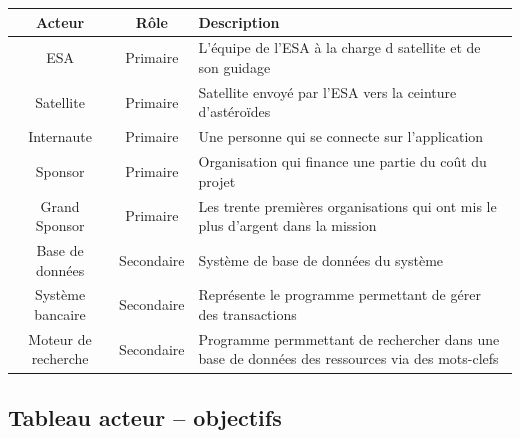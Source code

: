 \documentclass[11pt,a4paper]{article}
\begin{document}
\begin{tabularx}{\linewidth}{|c|c|X|}
    \hline
    \textbf{Acteur} & \textbf{R\^ole} & \textbf{Description} \\
    \hline
    
    ESA & Primaire & L'\'equipe de l'ESA à la charge d
    satellite et de son guidage \\
    
    \hline
    
    Satellite & Primaire & Satellite envoy\'e par l'ESA
    vers la ceinture d'ast\'ero\"ides \\
    
    \hline
    
    Internaute & Primaire & Une personne qui se connecte sur
    l'application \\
    
    \hline
    
    Sponsor & Primaire & Organisation qui finance une
    partie du co\^ut du projet \\
    
    \hline
    
    Grand Sponsor & Primaire & Les trente premières 
    organisations qui ont mis le plus d'argent dans 
    la mission \\
    
    \hline
    
    Base de donn\'ees & Secondaire & Syst\`eme de base 
    de donn\'ees du syst\`eme \\
    
    \hline
    
    Syst\`eme bancaire & Secondaire & Repr\'esente le 
    programme permettant de g\'erer des transactions \\
    
    \hline
    
    Moteur de recherche & Secondaire & Programme permmettant de rechercher dans une base de donn\'ees des ressources
    via des mots-clefs\\
    \hline

\end{tabularx}


\subsection{Tableau acteur -- objectifs}
\end{document}
